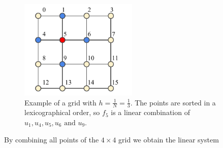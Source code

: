 \begin{figure}[tbp]
	\centering
	\includegraphics[width=0.5\textwidth]{chapters/chapter01/linear_order_2.pdf}
	\caption{Example of a grid with $h=\frac{1}{N} = \frac{1}{3}$. The points are sorted in a lexicographical order, so $f_5$ is a linear combination of $u_1, u_4, u_5, u_6 \textrm{ and } u_9$.}
	\label{fig:nat_order_2}
\end{figure}



By combining all points of the $4\times 4$ grid we obtain the linear system \cite{schwed}

